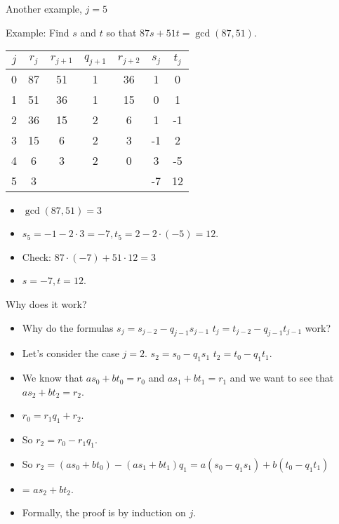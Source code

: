 \documentclass{beamer}
\begin{document}
\begin{frame}{Another example, $j=5$}

Example: Find $s$ and $t$ so that $87s+51t = \gcd(87, 51)$.

\vspace{1em}

\begin{tabular}{|c|c|c|c|c|c|c|}\hline
$j$   &  $r_{j}$    & $r_{j+1}$ & $q_{j+1}$ & $r_{j+2}$ & $s_j$ & $t_j$ \\ \hline\hline
0     &  87         &  51       &    1      &   36      &  1    &   0   \\ \hline
1     &  51         &  36       &    1      &   15      &  0    &   1   \\ \hline
2     &  36         &  15       &    2      &    6      &  1    &  -1   \\ \hline
3     &  15         &   6       &    2      &    3      & -1    &   2   \\ \hline
4     &   6         &   3       &    2      &    0      &  3    &  -5   \\ \hline
5     &   3         &           &           &           & -7    &  12   \\ \hline
\end{tabular}

\vspace{1em}

\begin{itemize}
  \item $\gcd(87,51) = 3$
  \item $s_5 = -1 - 2\cdot 3 = -7, t_5 = 2 - 2\cdot (-5) = 12$.
  \item Check: $87\cdot (-7) + 51\cdot 12 = 3$
  \item $s=-7, t=12$.
\end{itemize}


\end{frame}


\beamerdefaultoverlayspecification{<+->}

\begin{frame}{Why does it work?}
\begin{itemize}
\item Why do the formulas  $s_j=s_{j-2} - q_{j-1}s_{j-1}$ \quad $t_j=t_{j-2} - q_{j-1}t_{j-1}$ work?
\item Let's consider the case $j=2$. $s_2=s_0 - q_1s_1$ \quad $t_2=t_0 - q_1t_1$.
\item We know that $a s_0+bt_0 = r_0$ and $a s_1 + b t_1 = r_1$ and we want to see that $as_2+bt_2=r_2$.
\item $r_0 = r_1 q_1 + r_2$.
\item So $r_2 = r_0 - r_1 q_1$.
\item So $r_2 = (a s_0+bt_0) - (a s_1 + b t_1)q_1 = a(s_0 - q_1 s_1) + b(t_0 - q_1 t_1)$
\item = $as_2 + b t_2$.
\item Formally, the proof is by induction on $j$.

\end{itemize}
\end{frame}
\end{document}
